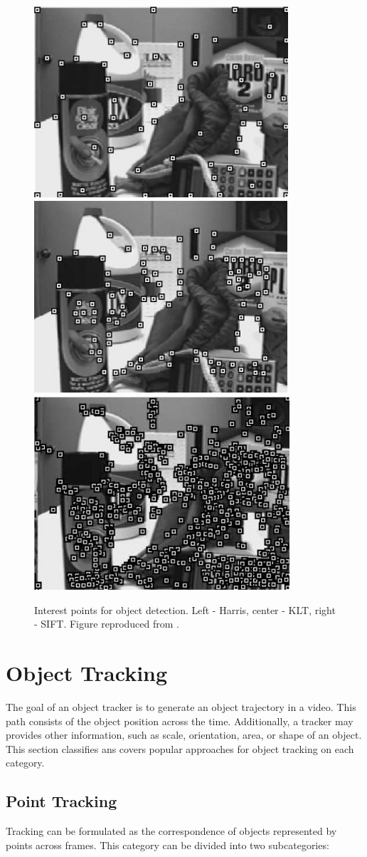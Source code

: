 \begin{figure}[h!!]
\centering
{
\includegraphics[width=0.32\linewidth]{Figures/points/harris.png}
\includegraphics[width=0.32\linewidth]{Figures/points/klt.png}
\includegraphics[width=0.32\linewidth]{Figures/points/sift.png}
}	
\caption[Interest points for object detection]
		{Interest points for object detection. Left - Harris, center - KLT, 
		right - SIFT. Figure reproduced from \cite{Yilmaz2006}.}
\end{figure}

\section{Object Tracking}
\label{sec::tracking}

The goal of an object tracker is to generate an object trajectory in a video.
This path consists of the object position across the time. Additionally,
a tracker may provides other information, such as scale, orientation, area, or
shape of an object. This section classifies ans covers popular approaches
for object tracking on each category.

\subsection{Point Tracking}

Tracking can be formulated as the correspondence of objects represented by
points across frames. This category can be divided into two subcategories:

